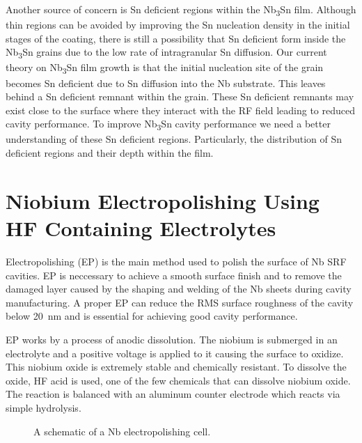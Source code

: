 Another source of concern is Sn deficient regions within the Nb\textsubscript{3}Sn film. Although thin regions can be avoided by improving the Sn nucleation density in the initial stages of the coating, there is still a possibility that Sn deficient form inside the Nb\textsubscript{3}Sn grains due to the low rate of intragranular Sn diffusion. Our current theory on Nb\textsubscript{3}Sn film growth is that the initial nucleation site of the grain becomes Sn deficient due to Sn diffusion into the Nb substrate. This leaves behind a Sn deficient remnant within the grain\cite{lee2018atomic}. These Sn deficient remnants may exist close to the surface where they interact with the RF field leading to reduced cavity performance. To improve Nb\textsubscript{3}Sn cavity performance we need a better understanding of these Sn deficient regions. Particularly, the distribution of Sn deficient regions and their depth within the film.















\section{Niobium Electropolishing Using HF Containing Electrolytes}


Electropolishing (EP) is the main method used to polish the surface of Nb SRF cavities. EP is neccessary to achieve a smooth surface finish and to remove the damaged layer caused by the shaping and welding of the Nb sheets during cavity manufacturing. A proper EP can reduce the RMS surface roughness of the cavity below \qty{20}{\nano\meter} and is essential for achieving good cavity performance.

EP works by a process of anodic dissolution. The niobium is submerged in an electrolyte and a positive voltage is applied to it causing the surface to oxidize. This niobium oxide is extremely stable and chemically resistant. To dissolve the oxide, HF acid is used, one of the few chemicals that can dissolve niobium oxide. The reaction is balanced with an aluminum counter electrode which reacts via simple hydrolysis. 

\begin{figure}[t]
    \centering
    
    
    \caption{A schematic of a Nb electropolishing cell.}
    \label{fig:diagram}
  \end{figure}

